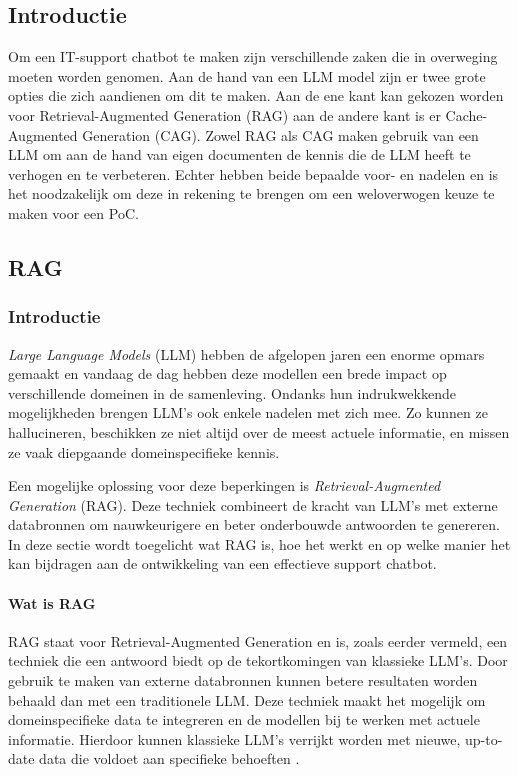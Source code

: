     \subsection{Introductie}
    
    Om een IT-support chatbot te maken zijn verschillende zaken die in overweging moeten worden genomen. Aan de hand van een LLM model zijn er twee grote opties die zich aandienen om dit te maken. Aan de ene kant kan gekozen worden voor Retrieval-Augmented Generation (RAG) aan de andere kant is er Cache-Augmented Generation (CAG). Zowel RAG als CAG maken gebruik van een LLM om aan de hand van eigen documenten de kennis die de LLM heeft te verhogen en te verbeteren. Echter hebben beide bepaalde voor- en nadelen en is het noodzakelijk om deze in rekening te brengen om een weloverwogen keuze te maken voor een PoC. 
    
    \subsection{RAG}
    \subsubsection{Introductie}   
    \textit{Large Language Models} (LLM) hebben de afgelopen jaren een enorme opmars gemaakt en vandaag de dag hebben deze modellen een brede impact op verschillende domeinen in de samenleving. Ondanks hun indrukwekkende mogelijkheden brengen LLM’s ook enkele nadelen met zich mee. Zo kunnen ze hallucineren, beschikken ze niet altijd over de meest actuele informatie, en missen ze vaak diepgaande domeinspecifieke kennis.  
    
    Een mogelijke oplossing voor deze beperkingen is \textit{Retrieval-Augmented Generation} (RAG). Deze techniek combineert de kracht van LLM’s met externe databronnen om nauwkeurigere en beter onderbouwde antwoorden te genereren. In deze sectie wordt toegelicht wat RAG is, hoe het werkt en op welke manier het kan bijdragen aan de ontwikkeling van een effectieve support chatbot.
    
    \paragraph{Wat is RAG}
    RAG staat voor Retrieval-Augmented Generation en is, zoals eerder vermeld, een techniek die een antwoord biedt op de tekortkomingen van klassieke LLM’s. Door gebruik te maken van externe databronnen kunnen betere resultaten worden behaald dan met een traditionele LLM. Deze techniek maakt het mogelijk om domeinspecifieke data te integreren en de modellen bij te werken met actuele informatie. Hierdoor kunnen klassieke LLM’s verrijkt worden met nieuwe, up-to-date data die voldoet aan specifieke behoeften \autocite{Wu2024}.
    
